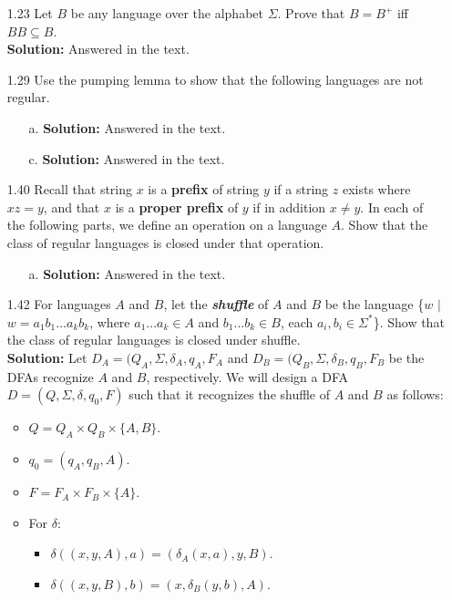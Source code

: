 \begin{enumerate}
\item[1.23]Let $B$ be any language over the alphabet $\Sigma$. Prove that $B = B^+$ iff $BB \subseteq B$.
\\
\textbf{Solution:} Answered in the text.

\item[1.29]Use the pumping lemma to show that the following languages are not regular.
\begin{enumerate}
\item[a.]\textbf{Solution:} Answered in the text.
\item[c.]\textbf{Solution:} Answered in the text.
\end{enumerate}

\item[1.40]Recall that string $x$ is a \textbf{prefix} of string $y$ if a string $z$ exists where $xz = y$, and that $x$ is a \textbf{proper prefix} of $y$ if in addition $x \ne y$. In each of the following parts, we define an operation on a language $A$. Show that the class of regular languages is closed under that operation.
\begin{enumerate}
\item[a.]\textbf{Solution:} Answered in the text.
\end{enumerate}

\item[1.42]For languages $A$ and $B$, let the \emph{\textbf{shuffle}} of $A$ and $B$ be the language \{$w$ $|$ $w=a_1b_1...a_kb_k$, where $a_1...a_k \in A$ and $b_1...b_k \in B$, each $a_i,b_i \in \Sigma^*$\}. Show that the class of regular languages is closed under shuffle.
\\
\textbf{Solution:} Let $D_A = (Q_A, \Sigma, \delta_A, q_A, F_A$ and $D_B = (Q_B, \Sigma, \delta_B, q_B, F_B$ be the DFAs recognize $A$ and $B$, respectively. We will design a DFA $D = (Q, \Sigma, \delta, q_0, F)$ such that it recognizes the shuffle of $A$ and $B$ as follows:
\begin{itemize}
\item $Q = Q_A \times Q_B \times \{A, B\}$.
\item $q_0 = (q_A, q_B, A)$.
\item $F = F_A \times F_B \times \{A\}$.
\item For $\delta$:
\begin{itemize}
\item $\delta((x, y, A), a) = (\delta_A(x, a), y, B)$.
\item $\delta((x, y, B), b) = (x, \delta_B(y, b), A)$.
\end{itemize}
\end{itemize}


\end{enumerate}
